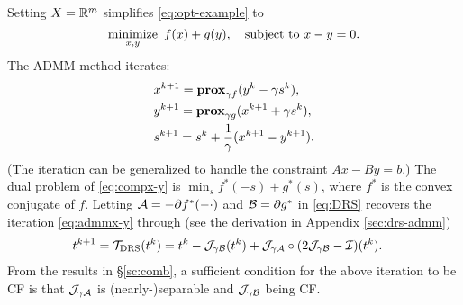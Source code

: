 {\DIFdelbegin %
\DIFdelend \DIFaddbegin \begin{example}\DIFaddend \label{alg:admm} Setting $X=\mathbb{R}^m$ simplifies \eqref{eq:opt-example} to 
\begin{equation}\label{eq:compx-y}
\Min_{x,y}~f(x)+g(y),\quad\St~ x-y=0.
\end{equation} 
The ADMM method iterates:
\begin{subequations}\label{eq:admmx-y}
\begin{align}
&x^{k+1}=\prox_{\gamma f}(y^k-\gamma s^k),\\%
&y^{k+1}=\prox_{\gamma g}(x^{k+1}+\gamma s^{k}),\\%
&s^{k+1}=s^k+\frac{1}{\gamma}(x^{k+1}-y^{k+1}).
\end{align}
\end{subequations}
(The iteration can be generalized to handle the constraint $Ax-By=b$.) The dual problem of \eqref{eq:compx-y} is $\min_s f^*(-s)+g^*(s)$, where $f^*$ is the convex conjugate of $f$. Letting ${\mathcal{A}}=-\partial f^*(-\cdot)$ and ${\mathcal{B}}=\partial g^*$ in \eqref{eq:DRS} recovers the iteration  \eqref{eq:admmx-y} through (see the derivation in Appendix \ref{sec:drs-admm})
\begin{align*}
&t^{k+1}=\TDRS(t^k)=t^k-\cJ_{\gamma \cB}(t^k)+\cJ_{\gamma\cA}\circ(2\cJ_{\gamma \cB}-\cI)(t^k).
\end{align*}  %
From the results in \S\ref{sc:comb}, a sufficient condition for the above iteration to be CF is that ${\mathcal{J}}_{\gamma{\mathcal{A}}}$ is (nearly-)separable and ${\mathcal{J}}_{\gamma{\mathcal{B}}}$ being CF. 
\end{example}


}
